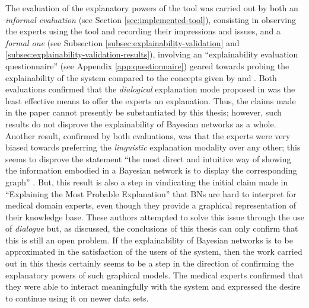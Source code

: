 The evaluation of the explanatory powers of the tool was carried out by both an \textit{informal evaluation} (see Section \ref{sec:implemented-tool}), consisting in observing the experts using the tool and recording their impressions and issues, and a \textit{formal one} (see Subsection \ref{subsec:explainability-validation} and \ref{subsec:explainability-validation-results}), involving an \enquote{explainability evaluation questionnaire} (see Appendix \ref{app:questionnaire}) geared towards probing the explainability of the system compared to the concepts given by \citet{lacave2002review} and \citet{miller2018explanation}.
Both evaluations confirmed that the \textit{dialogical} explanation mode proposed in \citet{Butz2018} was the least effective means to offer the experts an explanation.
Thus, the claims made in the paper cannot presently be substantiated by this thesis; however, such results do not disprove the explainability of Bayesian networks as a whole.
Another result, confirmed by both evaluations, was that the experts were very biased towards preferring the \textit{linguistic} explanation modality over any other; this seems to disprove the statement \enquote{the most direct and intuitive way of showing the information embodied in a Bayesian network is to display the corresponding graph} \citep{lacave2002review}.
But, this result is also a step in vindicating the initial claim made in \enquote{Explaining the Most Probable Explanation} \citep{Butz2018} that BNs are hard to interpret for medical domain experts, even though they provide a graphical representation of their knowledge base.
These authors attempted to solve this issue through the use of \textit{dialogue} but, as discussed, the conclusions of this thesis can only confirm that this is still an open problem.
If the explainability of Bayesian networks is to be approximated in the satisfaction of the users of the system, then the work carried out in this thesis certainly seems to be a step in the direction of confirming the explanatory powers of such graphical models.
The medical experts confirmed that they were able to interact meaningfully with the system and expressed the desire to continue using it on newer data sets.

